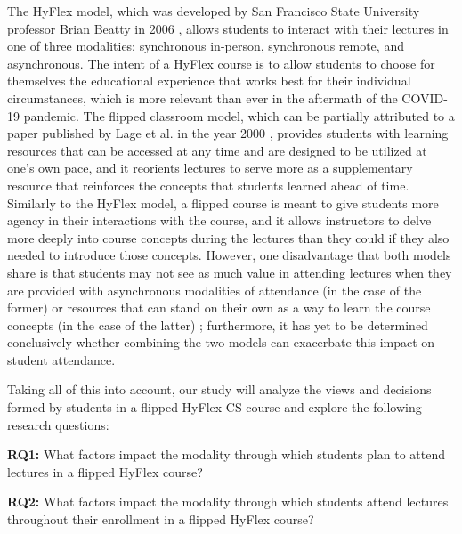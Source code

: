 The HyFlex model, which was developed by San Francisco State University professor Brian Beatty in 2006 \cite{beatty2014hybrid}, allows students to interact with their lectures in one of three modalities: synchronous in-person, synchronous remote, and asynchronous. The intent of a HyFlex course is to allow students to choose for themselves the educational experience that works best for their individual circumstances, which is more relevant than ever in the aftermath of the COVID-19 pandemic. The flipped classroom model, which can be partially attributed to a paper published by Lage et al. in the year 2000 \cite{lage2000inverting}, provides students with learning resources that can be accessed at any time and are designed to be utilized at one's own pace, and it reorients lectures to serve more as a supplementary resource that reinforces the concepts that students learned ahead of time. Similarly to the HyFlex model, a flipped course is meant to give students more agency in their interactions with the course, and it allows instructors to delve more deeply into course concepts during the lectures than they could if they also needed to introduce those concepts. However, one disadvantage that both models share is that students may not see as much value in attending lectures when they are provided with asynchronous modalities of attendance (in the case of the former) \cite{bali2018students} or resources that can stand on their own as a way to learn the course concepts (in the case of the latter) \cite{campbell2014evaluating}; furthermore, it has yet to be determined conclusively whether combining the two models can exacerbate this impact on student attendance.

Taking all of this into account, our study will analyze the views and decisions formed by students in a flipped HyFlex CS course and explore the following research questions:


\textbf{RQ1:} What factors impact the modality through which students plan to attend lectures in a flipped HyFlex course?

\textbf{RQ2:} What factors impact the modality through which students attend lectures throughout their enrollment in a flipped HyFlex course?